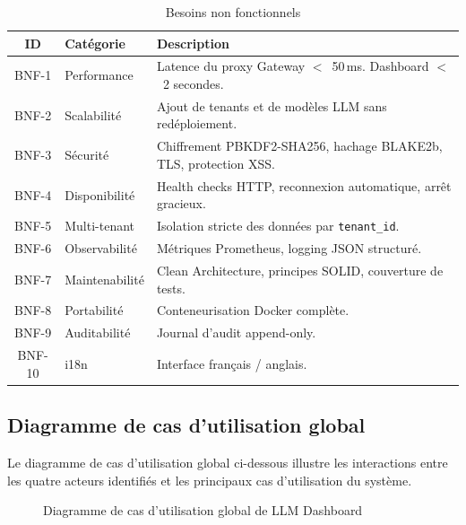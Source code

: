 \begin{table}[H]
\centering
\caption{Besoins non fonctionnels}
\label{tab:bnf}
\begin{tabularx}{\textwidth}{|c|l|X|}
\hline
\textbf{ID} & \textbf{Catégorie} & \textbf{Description} \\
\hline
BNF-1 & Performance & Latence du proxy Gateway $<$~50\,ms. Dashboard $<$~2 secondes. \\
\hline
BNF-2 & Scalabilité & Ajout de tenants et de modèles LLM sans redéploiement. \\
\hline
BNF-3 & Sécurité & Chiffrement PBKDF2-SHA256, hachage BLAKE2b, TLS, protection XSS. \\
\hline
BNF-4 & Disponibilité & Health checks HTTP, reconnexion automatique, arrêt gracieux. \\
\hline
BNF-5 & Multi-tenant & Isolation stricte des données par \texttt{tenant\_id}. \\
\hline
BNF-6 & Observabilité & Métriques Prometheus, logging JSON structuré. \\
\hline
BNF-7 & Maintenabilité & Clean Architecture, principes SOLID, couverture de tests. \\
\hline
BNF-8 & Portabilité & Conteneurisation Docker complète. \\
\hline
BNF-9 & Auditabilité & Journal d'audit append-only. \\
\hline
BNF-10 & i18n & Interface français / anglais. \\
\hline
\end{tabularx}
\end{table}


\subsection{Diagramme de cas d'utilisation global}

Le diagramme de cas d'utilisation global ci-dessous illustre les interactions entre les quatre acteurs identifiés et les principaux cas d'utilisation du système.

\begin{figure}[H]
    \centering
    \caption{Diagramme de cas d'utilisation global de LLM Dashboard}
    \label{fig:uc_global}
\end{figure}


